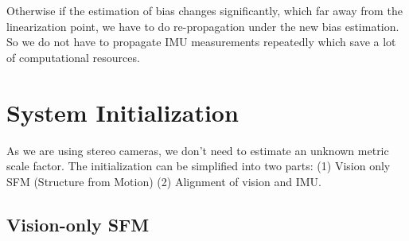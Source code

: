 \documentclass[12pt]{report}   %
\begin{document}
Otherwise if the estimation of bias changes significantly, which far away from the linearization point, we have to do re-propagation under the new bias estimation. So we do not have to propagate IMU measurements repeatedly which save a lot of computational resources.





\chapter{System Initialization}


As we are using stereo cameras, we don't need to estimate an unknown metric scale factor. The initialization can be simplified into two parts: (1) Vision only SFM (Structure from Motion) (2) Alignment of vision and IMU.

\section{Vision-only SFM}
\end{document}
